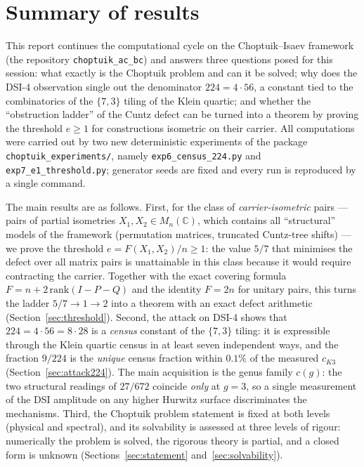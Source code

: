\documentclass[11pt,a4paper]{article}
\theoremstyle{definition}
\theoremstyle{remark}
\begin{document}
\tableofcontents
\newpage

\section{Summary of results}\label{sec:summary}

This report continues the computational cycle on the Choptuik--Isaev framework
(the repository \texttt{choptuik\_ac\_bc}) and answers three questions posed
for this session: what exactly is the Choptuik problem and can it be solved;
why does the DSI-4 observation single out the denominator $224 = 4\cdot 56$,
a constant tied to the combinatorics of the $\{7,3\}$ tiling of the Klein
quartic; and whether the ``obstruction ladder'' of the Cuntz defect can be
turned into a theorem by proving the threshold $e \ge 1$ for constructions
isometric on their carrier. All computations were carried out by two new
deterministic experiments of the package \texttt{choptuik\_experiments/},
namely \texttt{exp6\_census\_224.py} and \texttt{exp7\_e1\_threshold.py};
generator seeds are fixed and every run is reproduced by a single command.

The main results are as follows. First, for the class of
\emph{carrier-isometric} pairs --- pairs of partial isometries
$X_1, X_2 \in M_n(\mathbb{C})$, which contains all ``structural'' models of
the framework (permutation matrices, truncated Cuntz-tree shifts) --- we
prove the threshold $e = F(X_1,X_2)/n \ge 1$: the value $5/7$ that minimises
the defect over all matrix pairs is unattainable in this class because it
would require contracting the carrier. Together with the exact covering
formula $F = n + 2\,\mathrm{rank}(I - P - Q)$ and the identity $F = 2n$ for
unitary pairs, this turns the ladder $5/7 \to 1 \to 2$ into a theorem with
an exact defect arithmetic (Section~\ref{sec:threshold}). Second, the attack
on DSI-4 shows that $224 = 4\cdot 56 = 8\cdot 28$ is a \emph{census}
constant of the $\{7,3\}$ tiling: it is expressible through the Klein quartic
census in at least seven independent ways, and the fraction $9/224$ is the
\emph{unique} census fraction within $0.1\%$ of the measured $c_{K3}$
(Section~\ref{sec:attack224}). The main acquisition is the genus family
$c(g)$: the two structural readings of $27/672$ coincide \emph{only} at
$g = 3$, so a single measurement of the DSI amplitude on any higher Hurwitz
surface discriminates the mechanisms. Third, the Choptuik problem statement
is fixed at both levels (physical and spectral), and its solvability is
assessed at three levels of rigour: numerically the problem is solved, the
rigorous theory is partial, and a closed form is unknown
(Sections~\ref{sec:statement} and~\ref{sec:solvability}).
\end{document}
